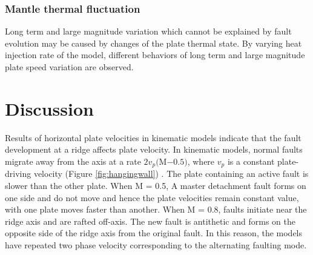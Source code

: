 \documentclass[letterpaper,12pt,notitle]{memphisthesis}                     %
\begin{document}
\subsection{Mantle thermal fluctuation}

Long term and large magnitude variation which cannot be explained by fault evolution may be caused by changes of the plate thermal state. By varying heat injection rate of the model, different behaviors of long term and large magnitude plate speed variation are observed. 


\chapter{Discussion}

Results of horizontal plate velocities in kinematic models indicate that the fault development at a ridge affects plate velocity. In kinematic models, normal faults migrate away from the axis at a rate $2v_p($M$-0.5)$, where $v_p$ is a constant plate-driving velocity (Figure \ref{fig:hangingwall}) \citep{Buck2005}. The plate containing an active fault is slower than the other plate. When M = 0.5, A master detachment fault forms on one side and do not move and hence the plate velocities remain constant value, with one plate moves faster than another. When M = 0.8, faults initiate near the ridge axis and are rafted off-axis. The new fault is antithetic and forms on the opposite side of the ridge axis from the original fault. In this reason, the models have repeated two phase velocity corresponding to the alternating faulting mode.
\end{document}
